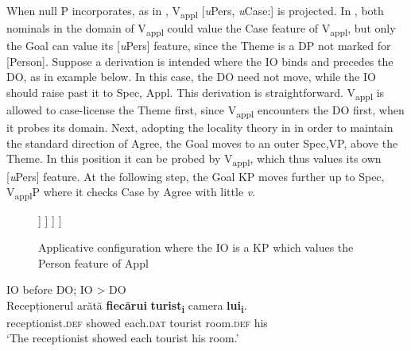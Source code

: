 \documentclass[output=paper,colorlinks,citecolor=brown,nonflat]{langsci/langscibook}
\begin{document}
When null P incorporates, as in , V\textsubscript{appl} [\textit{u}Pers, \textit{u}Case:{\longrule}] is projected. In , both nominals in the domain of V\textsubscript{appl} could value the Case feature of V\textsubscript{appl}, but only the Goal can value its [\textit{u}Pers{\longrule}] feature, since the Theme is a DP not marked for [Person]. Suppose a derivation is intended where the IO binds and precedes the DO, as in example  below. In this case, the DO need not move, while the IO should raise past it to Spec, Appl. This derivation is straightforward. V\textsubscript{appl} is allowed to case-license the Theme first, since V\textsubscript{appl} encounters the DO first, when it probes its domain. Next, adopting the locality theory in \citet{Dogget2004} in order to maintain the standard direction of Agree, the Goal moves to an outer Spec,VP, above the Theme. In this position it can be probed by V\textsubscript{appl}, which thus values its own [\textit{u}Pers] feature. At the following step, the Goal KP moves further up to Spec, V\textsubscript{appl}P where it checks Case by Agree with little \textit{v}.


\begin{figure}%
	\begin{forest}
		[\textit{v}P
			[\textit{v}
			]
			[V\textsubscript{Appl}P
				[{V\textsubscript{Appl}\\
					{[}\textit{u}Pers:\_\_{, u}Case:\_\_{]}}
				]
				[VP
					[DP\textsubscript{Theme}\\{[}Case: \textsc{acc}{]}
					]
					[V'
						[{V\\P+V}
						]
						[{KP\textsubscript{Goal}\\{[}\textit{u}Case: \textsc{dat}, \textbf{iPers}{]}}
						]
					]
				]
			]
		]
	\end{forest}
	\caption{\label{fig:cornilescu:8} Applicative configuration where the IO is a KP which values the Person feature of Appl}
\end{figure}

\ea%
      \label{ex:cornilescu:25}
      IO before DO; IO > DO \\
      \gll Recepționerul arătă \textbf{fiecărui} \textbf{turist\textsubscript{i}} camera \textbf{lui\textsubscript{i}}.\\
           receptionist.\textsc{def} showed each.\textsc{dat} tourist room.\textsc{def} his\\
      \glt ‘The receptionist showed each tourist his room.’ \citep{CornilescuDinuTigău2017DOC}
      \z
\end{document}

